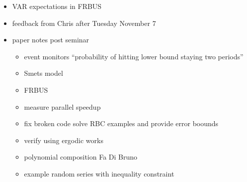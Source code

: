 \documentclass[hyperref]{labbook}
\begin{document}

\begin{itemize}
\item VAR expectations in FRBUS
\item feedback from Chris after Tuesday November 7
\item paper notes post seminar
  \begin{itemize}
  \item event monitors 
``probability of hitting lower bound staying two periods''
  \item Smets model
  \item FRBUS
  \item measure parallel speedup
  \item fix broken code solve RBC examples and provide error boounds
  \item verify using ergodic works
  \item polynomial composition Fa Di Bruno
  \item example random series with inequality constraint
  \end{itemize}

\end{itemize}
\end{document}
